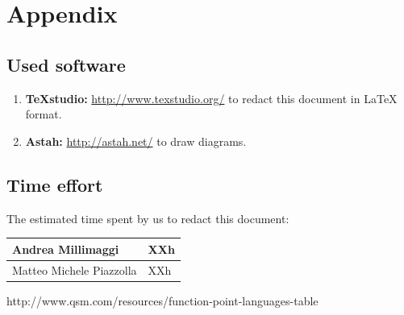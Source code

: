 \documentclass[english]{article}
\providecommand{\tabularnewline}{\\}
\begin{document}
	\listoffigures
	
	\newpage{}


	
	\pagebreak
	
	\pagebreak
	
	\pagebreak
	
	\pagebreak
	
	\pagebreak
	\section{Appendix}


	\subsection{Used software}
	\begin{enumerate}
		\item \textbf{TeXstudio:} \url{http://www.texstudio.org/} to redact this document in {\LaTeX} format.
		\item \textbf{Astah:} \url{http://astah.net/} to draw diagrams.		
	\end{enumerate}
	
	
	\subsection{Time effort}
	The estimated time spent by us to redact this document:
	\begin{center}
		\begin{adjustbox}{max width=\textwidth}	
			\begin{tabular}{|l|>{\raggedright}p{15cm}|}
				
				\hline  Andrea Millimaggi & XXh \tabularnewline
				\hline 	Matteo Michele Piazzolla & XXh \tabularnewline
				\hline 		
			\end{tabular}
		\end{adjustbox}
	\end{center}	
\begin{thebibliography}{5}
	http://www.qsm.com/resources/function-point-languages-table
\end{thebibliography}
\end{document}
